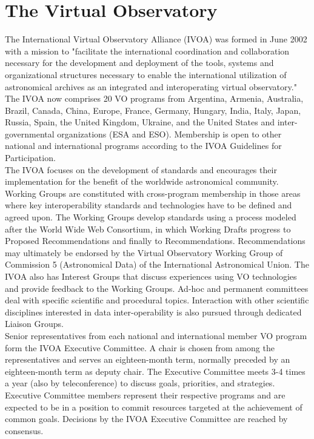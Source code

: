 \chapter{The Virtual Observatory}

The International Virtual Observatory Alliance (IVOA) was formed in June 2002 with a mission to "facilitate the international coordination and collaboration necessary for the development and deployment of the tools, systems and organizational structures necessary to enable the international utilization of astronomical archives as an integrated and interoperating virtual observatory." The IVOA now comprises 20 VO programs from Argentina, Armenia, Australia, Brazil, Canada, China, Europe, France, Germany, Hungary, India, Italy, Japan, Russia, Spain, the United Kingdom, Ukraine, and the United States and inter-governmental organizations (ESA and ESO). Membership is open to other national and international programs according to the IVOA Guidelines for Participation.\\

The IVOA focuses on the development of standards and encourages their implementation for the benefit of the worldwide astronomical community. Working Groups are constituted with cross-program membership in those areas where key interoperability standards and technologies have to be defined and agreed upon. The Working Groups develop standards using a process modeled after the World Wide Web Consortium, in which Working Drafts progress to Proposed Recommendations and finally to Recommendations. Recommendations may ultimately be endorsed by the Virtual Observatory Working Group of Commission 5 (Astronomical Data) of the International Astronomical Union. The IVOA also has Interest Groups that discuss experiences using VO technologies and provide feedback to the Working Groups. Ad-hoc and permanent committees deal with specific scientific and procedural topics. Interaction with other scientific disciplines interested in data inter-operability is also pursued through dedicated Liaison Groups.\\

Senior representatives from each national and international member VO program form the IVOA Executive Committee. A chair is chosen from among the representatives and serves an eighteen-month term, normally preceded by an eighteen-month term as deputy chair. The Executive Committee meets 3-4 times a year (also by teleconference) to discuss goals, priorities, and strategies. Executive Committee members represent their respective programs and are expected to be in a position to commit resources targeted at the achievement of common goals. Decisions by the IVOA Executive Committee are reached by consensus.\\

